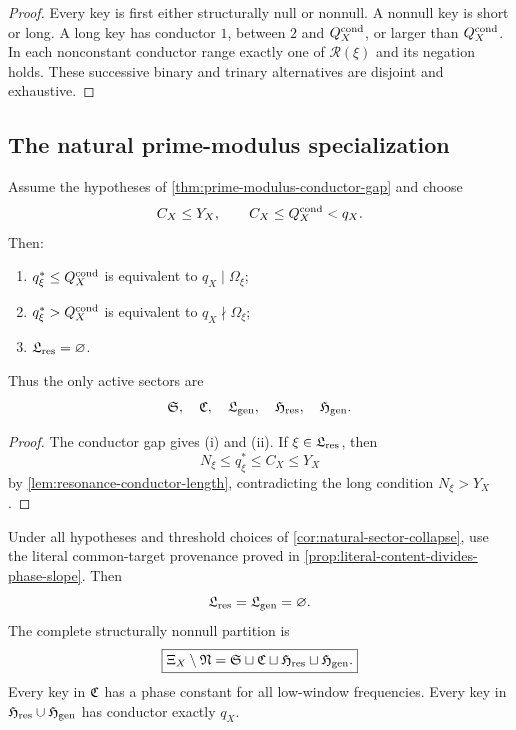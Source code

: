 \begin{proof}
Every key is first either structurally null or nonnull.  A nonnull
key is short or long.  A long key has conductor \(1\), between
\(2\) and \(Q_X^{\rm cond}\), or larger than
\(Q_X^{\rm cond}\).  In each nonconstant conductor range exactly one
of \(\mathcal R(\xi)\) and its negation holds.  These successive
binary and trinary alternatives are disjoint and exhaustive.
\end{proof}

\subsection{The natural prime-modulus specialization}

\begin{corollary}
\label{cor:natural-sector-collapse}
Assume the hypotheses of
\cref{thm:prime-modulus-conductor-gap} and choose
\[
 C_X\le Y_X,\qquad
 C_X\le Q_X^{\rm cond}<q_X.
\]
Then:
\begin{enumerate}[label=(\roman*),leftmargin=2.2em]
\item \(q_\xi^\ast\le Q_X^{\rm cond}\) is equivalent to
  \(q_X\mid\Omega_\xi\);
\item \(q_\xi^\ast>Q_X^{\rm cond}\) is equivalent to
  \(q_X\nmid\Omega_\xi\);
\item \(\mathfrak L_{\rm res}=\varnothing\).
\end{enumerate}
Thus the only active sectors are
\[
 \mathfrak S,\quad\mathfrak C,\quad\mathfrak L_{\rm gen},\quad
 \mathfrak H_{\rm res},\quad\mathfrak H_{\rm gen}.
\]
\end{corollary}

\begin{proof}
The conductor gap gives (i) and (ii).  If
\(\xi\in\mathfrak L_{\rm res}\), then
\[
 N_\xi\le q_\xi^\ast\le C_X\le Y_X
\]
by \cref{lem:resonance-conductor-length}, contradicting the long
condition \(N_\xi>Y_X\).
\end{proof}

\begin{corollary}
\label{cor:literal-four-sector-collapse}
Under all hypotheses and threshold choices of
\cref{cor:natural-sector-collapse}, use the literal common-target
provenance proved in
\cref{prop:literal-content-divides-phase-slope}.  Then
\[
 \mathfrak L_{\rm res}=\mathfrak L_{\rm gen}=\varnothing.
\]
The complete structurally nonnull partition is
\begin{equation}
 \boxed{
 \Xi_X\setminus\mathfrak N
 =
 \mathfrak S\sqcup\mathfrak C\sqcup\mathfrak H_{\rm res}\sqcup\mathfrak H_{\rm gen}.}
\label{eq:literal-four-sector-partition}
\end{equation}
Every key in \(\mathfrak C\) has a phase constant for all low-window
frequencies.  Every key in \(\mathfrak H_{\rm res}\cup\mathfrak H_{\rm gen}\) has conductor
exactly \(q_X\).
\end{corollary}

